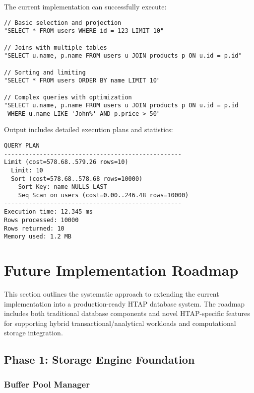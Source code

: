 \documentclass[12pt,a4paper]{article}
\begin{document}
    The current implementation can successfully execute:

    \begin{lstlisting}[style=cpp, caption=Supported Query Examples]
// Basic selection and projection
"SELECT * FROM users WHERE id = 123 LIMIT 10"

// Joins with multiple tables
"SELECT u.name, p.name FROM users u JOIN products p ON u.id = p.id"

// Sorting and limiting
"SELECT * FROM users ORDER BY name LIMIT 10"

// Complex queries with optimization
"SELECT u.name, p.name FROM users u JOIN products p ON u.id = p.id
 WHERE u.name LIKE 'John%' AND p.price > 50"
    \end{lstlisting}

    Output includes detailed execution plans and statistics:

    \begin{lstlisting}[caption=Example Execution Plan Output]
QUERY PLAN
--------------------------------------------------
Limit (cost=578.68..579.26 rows=10)
  Limit: 10
  Sort (cost=578.68..578.68 rows=10000)
    Sort Key: name NULLS LAST
    Seq Scan on users (cost=0.00..246.48 rows=10000)
--------------------------------------------------
Execution time: 12.345 ms
Rows processed: 10000
Rows returned: 10
Memory used: 1.2 MB
    \end{lstlisting}

    \section{Future Implementation Roadmap}

    This section outlines the systematic approach to extending the current implementation into a production-ready HTAP database system. The roadmap includes both traditional database components and novel HTAP-specific features for supporting hybrid transactional/analytical workloads and computational storage integration.

    \subsection{Phase 1: Storage Engine Foundation}

    \subsubsection{Buffer Pool Manager}
\end{document}
